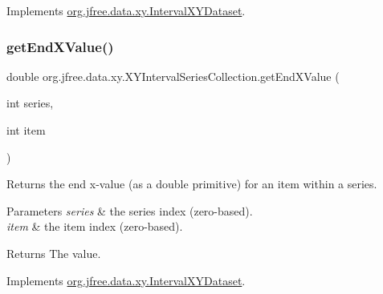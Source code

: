 Implements \mbox{\hyperlink{interfaceorg_1_1jfree_1_1data_1_1xy_1_1_interval_x_y_dataset_a93161a6d6c1db37cfac030239c62ab0a}{org.\+jfree.\+data.\+xy.\+Interval\+X\+Y\+Dataset}}.

\mbox{\label{classorg_1_1jfree_1_1data_1_1xy_1_1_x_y_interval_series_collection_ae3675851fa4f1058f12edc92fd6fa997}} 
\subsubsection{\texorpdfstring{get\+End\+X\+Value()}{getEndXValue()}}
{\footnotesize\ttfamily double org.\+jfree.\+data.\+xy.\+X\+Y\+Interval\+Series\+Collection.\+get\+End\+X\+Value (\begin{DoxyParamCaption}\item[{int}]{series,  }\item[{int}]{item }\end{DoxyParamCaption})}

Returns the end x-\/value (as a double primitive) for an item within a series.


\begin{DoxyParams}{Parameters}
{\em series} & the series index (zero-\/based). \\
\hline
{\em item} & the item index (zero-\/based).\\
\hline
\end{DoxyParams}
\begin{DoxyReturn}{Returns}
The value. 
\end{DoxyReturn}


Implements \mbox{\hyperlink{interfaceorg_1_1jfree_1_1data_1_1xy_1_1_interval_x_y_dataset_ad976e66caa1fc4d72a599f2c26c55dcc}{org.\+jfree.\+data.\+xy.\+Interval\+X\+Y\+Dataset}}.

\mbox{\label{classorg_1_1jfree_1_1data_1_1xy_1_1_x_y_interval_series_collection_abba1f60de92dc0c6d7bda0d064c04d70}} 

